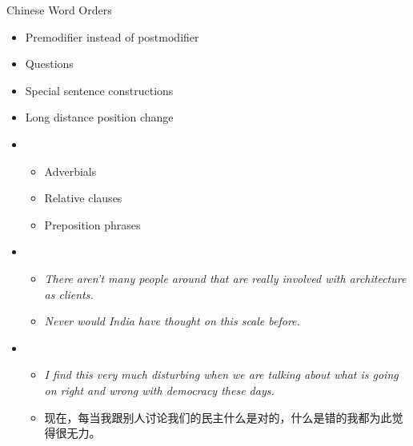 \documentclass[18pt]{beamer}
\newcommand{\cntext}[1]{\begin{CJK}{UTF8}{gbsn}#1\end{CJK}}
\begin{document}
\begin{frame}{Chinese Word Orders}
\begin{itemize}[<+-| alert@+>]
\item Premodifier instead of postmodifier
\item Questions
\item Special sentence constructions
\item Long distance position change
\end{itemize}
\begin{overprint}
\vspace{-2cm}
\begin{itemize}
\item[]
\begin{itemize}
	\item Adverbials
	\item Relative clauses
	\item Preposition phrases
\end{itemize}
\end{itemize}	
\begin{figure}
\centering

\end{figure}
\vspace{-1.2cm}
\begin{figure}
\centering

\end{figure}
\begin{itemize}
\item[]
\begin{itemize}
\item[] \textit{\alert{There aren't} many people around that are really involved with architecture as clients.} \bigskip \\
\item[] \textit{\alert{Never would} India have thought on this scale before.}
\end{itemize}
\end{itemize}
\begin{itemize}
\item[]
\begin{itemize}
\item[] \textit{I find this very much disturbing \alert{when we are talking about what is going on right and wrong with democracy these days}.} \bigskip \\
\item[] \cntext{\alert{现在，每当我跟别人讨论我们的民主什么是对的，什么是错的}我都为此觉得很无力。}
\end{itemize}
\end{itemize}
\end{overprint}
\end{frame}
\end{document}
